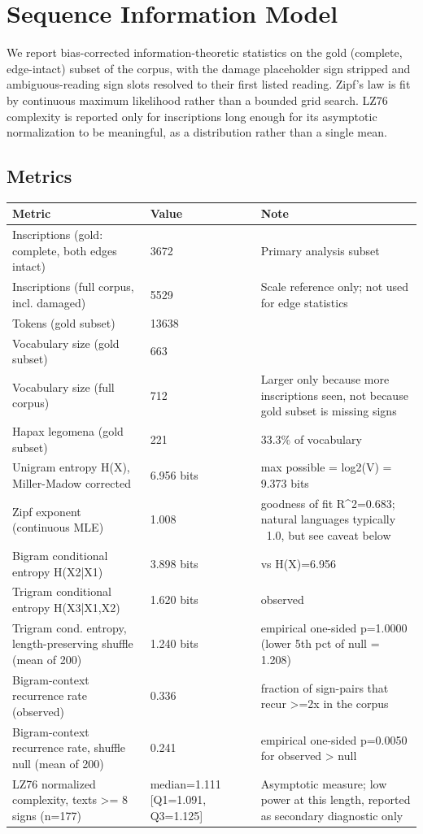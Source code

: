 \section{Sequence Information Model}

We report bias-corrected information-theoretic statistics on the gold
(complete, edge-intact) subset of the corpus, with the damage placeholder
sign stripped and ambiguous-reading sign slots resolved to their first listed
reading. Zipf's law is fit by continuous maximum likelihood rather than a
bounded grid search. LZ76 complexity is reported only for inscriptions long
enough for its asymptotic normalization to be meaningful, as a distribution
rather than a single mean.

\subsection{Metrics}
\begin{tabular}{p{}p{}p{}}
\toprule
\textbf{Metric} & \textbf{Value} & \textbf{Note} \\
\midrule
Inscriptions (gold: complete, both edges intact) & 3672 & Primary analysis subset \\
Inscriptions (full corpus, incl. damaged) & 5529 & Scale reference only; not used for edge statistics \\
Tokens (gold subset) & 13638 &  \\
Vocabulary size (gold subset) & 663 &  \\
Vocabulary size (full corpus) & 712 & Larger only because more inscriptions seen, not because gold subset is missing signs \\
Hapax legomena (gold subset) & 221 & 33.3\% of vocabulary \\
Unigram entropy H(X), Miller-Madow corrected & 6.956 bits & max possible = log2(V) = 9.373 bits \\
Zipf exponent (continuous MLE) & 1.008 & goodness of fit R^2=0.683; natural languages typically ~1.0, but see caveat below \\
Bigram conditional entropy H(X2|X1) & 3.898 bits & vs H(X)=6.956 \\
Trigram conditional entropy H(X3|X1,X2) & 1.620 bits & observed \\
Trigram cond. entropy, length-preserving shuffle (mean of 200) & 1.240 bits & empirical one-sided p=1.0000 (lower 5th pct of null = 1.208) \\
Bigram-context recurrence rate (observed) & 0.336 & fraction of sign-pairs that recur >=2x in the corpus \\
Bigram-context recurrence rate, shuffle null (mean of 200) & 0.241 & empirical one-sided p=0.0050 for observed > null \\
LZ76 normalized complexity, texts >= 8 signs (n=177) & median=1.111 [Q1=1.091, Q3=1.125] & Asymptotic measure; low power at this length, reported as secondary diagnostic only \\
\bottomrule
\end{tabular}
